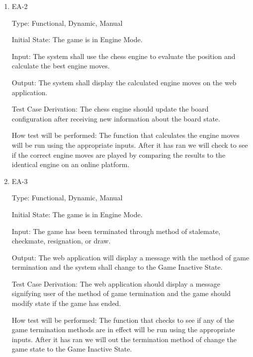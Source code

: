\documentclass[12pt, titlepage]{article}
\begin{document}
\begin{enumerate}
      \item{EA-2\\}
  
      Type: Functional, Dynamic, Manual
                        
      Initial State: The game is in Engine Mode.
                          
      Input: The system shall use the chess engine to evaluate the position and calculate the best
      engine moves.
                          
      Output: The system shall display the calculated engine moves on the web application.
                          
      Test Case Derivation: The chess engine should update the board configuration after receiving new information about the board state. 
  
      How test will be performed: The function that calculates the engine moves
      will be run using the appropriate inputs. After it has ran we will check to see if the correct engine moves are played
      by comparing the results to the identical engine on an online platform.
  
      \item{EA-3\\}
  
      Type: Functional, Dynamic, Manual
                        
      Initial State: The game is in Engine Mode.
                          
      Input: The game has been terminated through method of stalemate, checkmate, resignation, or draw.
                          
      Output: The web application will display a message with the method of game termination and the
      system shall change to the Game Inactive State.
                          
      Test Case Derivation: The web application should display a message signifying user of the method of game termination
      and the game should modify state if the game has ended.
  
      How test will be performed: The function that checks to see if any of the game termination methods are in effect
      will be run using the appropriate inputs. After it has ran we will out the termination method of change the
      game state to the Game Inactive State.
  
    \end{enumerate}
     
\end{document}
